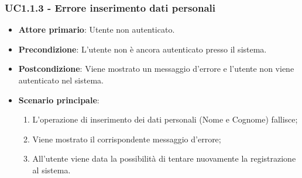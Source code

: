 \subsubsection{UC1.1.3 - Errore inserimento dati personali}
\begin{itemize}
\item \textbf{Attore primario}: Utente non autenticato.
\item \textbf{Precondizione}: L'utente non è ancora autenticato presso il sistema.
\item \textbf{Postcondizione}: Viene mostrato un messaggio d'errore e l'utente non viene autenticato nel sistema.

\item \textbf{Scenario principale}:
\begin{enumerate}
\item L'operazione di inserimento dei dati personali (Nome e Cognome) fallisce;
\item Viene mostrato il corrispondente messaggio d'errore;
\item All'utente viene data la possibilità di tentare nuovamente la registrazione al sistema.
\end{enumerate}
\end{itemize}


